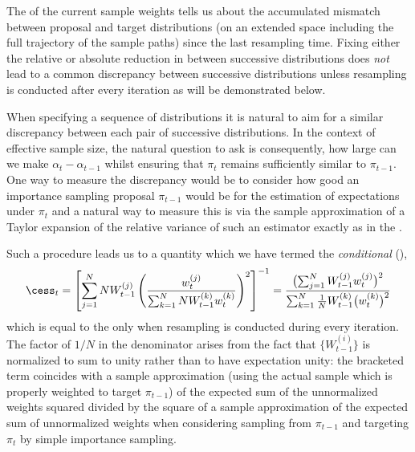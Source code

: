 The \ess of the current sample weights tells us about the accumulated mismatch
between proposal and target distributions (on an extended space including the
full trajectory of the sample paths) since the last resampling time. Fixing
either the relative or absolute reduction in \ess between successive
distributions does \emph{not} lead to a common discrepancy between successive
distributions unless resampling is conducted after every iteration as will be
demonstrated below.

When specifying a sequence of distributions it is natural to aim for a similar
discrepancy between each pair of successive distributions. In the context of
effective sample size, the natural question to ask is consequently, how large
can we make $\alpha_t - \alpha_{t-1}$ whilst ensuring that $\pi_{t}$ remains
sufficiently similar to $\pi_{t-1}$. One way to measure the discrepancy would
be to consider how good an importance sampling proposal $\pi_{t-1}$ would be
for the estimation of expectations under $\pi_t$ and a natural way to measure
this is via the sample approximation of a Taylor expansion of the relative
variance of such an estimator exactly as in the \ess.

Such a procedure leads us to a quantity which we have termed the
\emph{conditional} \ess (\cess),
\begin{equation}
  \cess_t = \left[ {\sum_{j=1}^N N W_{t-1}^{(j)} \left(
        \frac{w_t^{(j)}}{\sum_{k=1}^N
          N W_{t-1}^{(k)}w_t^{(k)}}\right)^2} \right]^{-1}
  = \frac{\bigl(\sum_{j=1}^NW_{t-1}^{(j)}w_t^{(j)}\bigr)^2}
  {\sum_{k=1}^N \frac{1}{N} W_{t-1}^{(k)} \bigl(w_t^{(k)}\bigr)^2}
\end{equation}
which is equal to the \ess only when resampling is conducted during every
iteration. The factor of $1/N$ in the denominator arises from the fact that
$\{W_{t-1}^{(i)}\}$ is normalized to sum to unity rather than to have expectation
unity: the bracketed term coincides with a sample approximation (using the
actual sample which is properly weighted to target $\pi_{t-1}$) of the
expected sum of the unnormalized weights squared divided by the square of a
sample approximation of the expected sum of unnormalized weights when
considering sampling from $\pi_{t-1}$ and targeting $\pi_t$ by simple
importance sampling.

